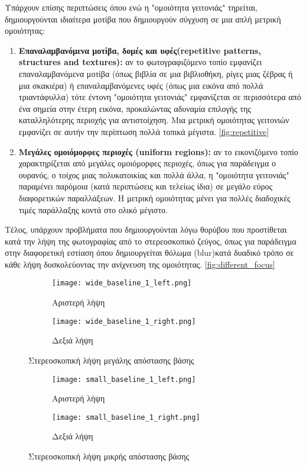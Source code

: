 Υπάρχουν επίσης περιπτώσεις όπου ενώ η "ομοιότητα γειτονιάς" τηρείται, δημιουργούνται ιδιαίτερα μοτίβα που δημιουργούν σύγχυση σε μια απλή μετρική ομοιότητας:
\begin{enumerate}[label=\textbf{\arabic*.}, ref={\arabic*}]
	\item \label{prop:repetitice_patterns}\textbf{Επαναλαμβανόμενα μοτίβα, δομές και υφές\e(repetitive patterns, structures and textures):\g} αν το φωτογραφιζόμενο τοπίο εμφανίζει επαναλαμβανόμενα μοτίβα (όπως βιβλία σε μια βιβλιοθήκη, ρίγες μιας ζέβρας ή μια σκακιέρα) ή επαναλαμβανόμενες υφές (όπως μια εικόνα από πολλά τριαντάφυλλα) τότε έντονη "ομοιότητα γειτονιάς" εμφανίζεται σε περισσότερα από ένα σημεία στην έτερη εικόνα, προκαλώντας αδυναμία επιλογής της καταλληλότερης περιοχής για αντιστοίχηση. Μια μετρική ομοιότητας γειτονιών εμφανίζει σε αυτήν την περίπτωση πολλά τοπικά μέγιστα. \ref{fig:repetitive}
	\item \label{prop:uniform_regions}\textbf{Μεγάλες ομοιόμορφες περιοχές \e(uniform regions):\g} αν το εικονιζόμενο τοπίο χαρακτηρίζεται από μεγάλες ομοιόμορφες περιοχές, όπως για παράδειγμα ο ουρανός, ο τοίχος μιας πολυκατοικίας και πολλά άλλα, η "ομοιότητα γειτονιάς" παραμένει παρόμοια (κατά περιπτώσεις και τελείως ίδια) σε μεγάλο εύρος διαφορετικών παραλλάξεων. Η μετρική ομοιότητας μένει για πολλές διαδοχικές τιμές παράλλαξης κοντά στο ολικό μέγιστο.
\end{enumerate}

Τέλος, υπάρχουν προβλήματα που δημιουργούνται λόγω θορύβου που προστίθεται κατά την λήψη της φωτογραφίας από το στερεοσκοπικό ζεύγος, όπως για παράδειγμα στην διαφορετική εστίαση όπου δημιουργείται θόλωμα \e(blur)\g κατά δυαδικό τρόπο σε κάθε λήψη δυσκολεύοντας την ανίχνευση της ομοιότητας. \ref{fig:different_focus}

\begin{figure}
	\centering
	\begin{subfigure}{.49\textwidth}
		\texttt{[image: wide\_baseline\_1\_left.png]}
		\caption{Αριστερή λήψη}
	\end{subfigure}
	\begin{subfigure}{.49\textwidth}
		\texttt{[image: wide\_baseline\_1\_right.png]}
		\caption{Δεξιά λήψη}
	\end{subfigure}
	\caption{Στερεοσκοπική λήψη μεγάλης απόστασης βάσης}
	\label{fig:wide_baseline}
\end{figure}

\begin{figure}
	\centering
	\begin{subfigure}{.49\textwidth}
		\texttt{[image: small\_baseline\_1\_left.png]}
		\caption{Αριστερή λήψη}
	\end{subfigure}
	\begin{subfigure}{.49\textwidth}
		\texttt{[image: small\_baseline\_1\_right.png]}
		\caption{Δεξιά λήψη}
	\end{subfigure}
	\caption{Στερεοσκοπική λήψη μικρής απόστασης βάσης}
	\label{fig:small_baseline}
\end{figure}

